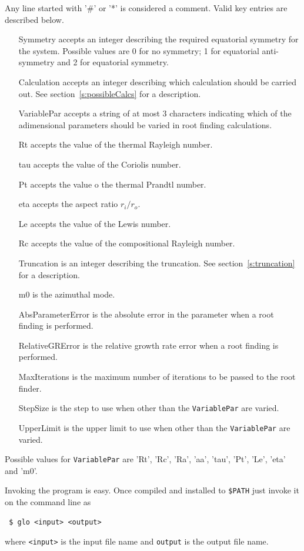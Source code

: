 \documentclass[a4paper,10pt]{book}
\begin{document}
Any line started with '\#' or '*' is considered a comment.
Valid key entries are described below.
\begin{itemize}
\item[Symmetry] accepts an integer describing the required equatorial symmetry for the system. Possible values are 0 for no symmetry; 1 for equatorial anti-symmetry and 2 for equatorial symmetry.
\item[Calculation] accepts an integer describing which calculation should be carried out. See section~\ref{s:possibleCalcs} for a description.
\item[VariablePar] accepts a string of at most 3 characters indicating which of the adimensional parameters should be varied in root finding calculations.
\item[Rt] accepts the value of the thermal Rayleigh number.
\item[tau] accepts the value of the Coriolis number.
\item[Pt] accepts the value o the thermal Prandtl number.
\item[eta] accepts the aspect ratio $r_i/r_o$. 
\item[Le] accepts the value of the Lewis number.
\item[Rc] accepts the value of the compositional Rayleigh number.
\item[Truncation] is an integer describing the truncation. See section~\ref{s:truncation} for a description.
\item[m0] is the azimuthal mode.
\item[AbsParameterError] is the absolute error in the parameter when a root finding is performed.
\item[RelativeGRError] is the relative growth rate error when a root finding is performed.
\item[MaxIterations] is the maximum number of iterations to be passed to the root finder.
\item[StepSize] is the step to use when other than the \verb|VariablePar| are varied.
\item[UpperLimit] is the upper limit to use when other than the \verb|VariablePar| are varied.
\end{itemize}

Possible values for \verb|VariablePar| are 'Rt', 'Rc', 'Ra', 'aa', 'tau', 'Pt', 
'Le', 'eta' and 'm0'.

Invoking the program is easy. Once compiled and installed to \verb|$PATH| just
invoke it on the command line as
\begin{verbatim}
 $ glo <input> <output>
\end{verbatim}
where \verb|<input>| is the input file name and \verb|output| is the output file
name.
\end{document}
